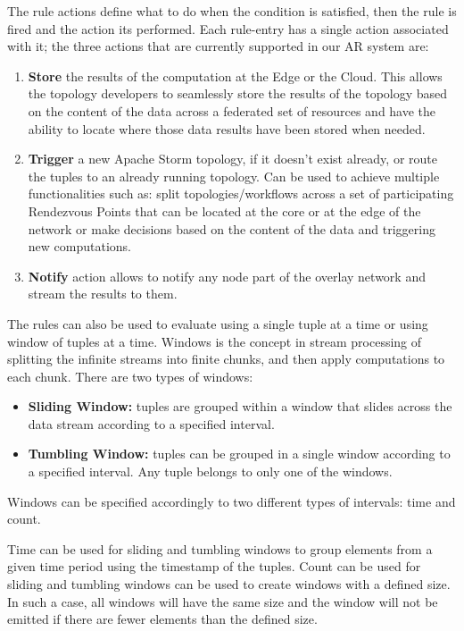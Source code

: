 The rule actions define what to do when the condition is satisfied, then the rule is fired and the action its performed. Each rule-entry has a single action associated with it; the three actions that are currently supported in our AR system are:

\begin{enumerate}
  \item \textbf{Store} the results of the computation at the Edge or the Cloud. This allows the topology developers to seamlessly store the results of the topology based on the content of the data across a federated set of resources and have the ability to locate where those data results have been stored when needed.
  \item \textbf{Trigger} a new Apache Storm topology, if it doesn't exist already, or route the tuples to an already running topology. Can be used to achieve multiple functionalities such as: split topologies/workflows across a set of participating Rendezvous Points that can be located at the core or at the edge of the network or make decisions based on the content of the data and triggering new computations.
  \item \textbf{Notify} action allows to notify any node part of the overlay network and stream the results to them.
\end{enumerate}

The rules can also be used to evaluate using a single tuple at a time or using window of tuples at a time. Windows is the concept in stream processing of splitting the infinite streams into finite chunks, and then apply computations to each chunk. There are two types of windows:

\begin{itemize}
    \item \textbf{Sliding Window:} tuples are grouped within a window that slides across the data stream according to a specified interval.
    \item \textbf{Tumbling Window:} tuples can be grouped in a single window according to a specified interval. Any tuple belongs to only one of the windows.
\end{itemize}

Windows can be specified accordingly to two different types of intervals: time and count.

Time can be used for sliding and tumbling windows to group elements from a given time period using the timestamp of the tuples. Count can be used for sliding and tumbling windows can be used to create windows with a defined size. In such a case, all windows will have the same size and the window will not be emitted if there are fewer elements than the defined size.


